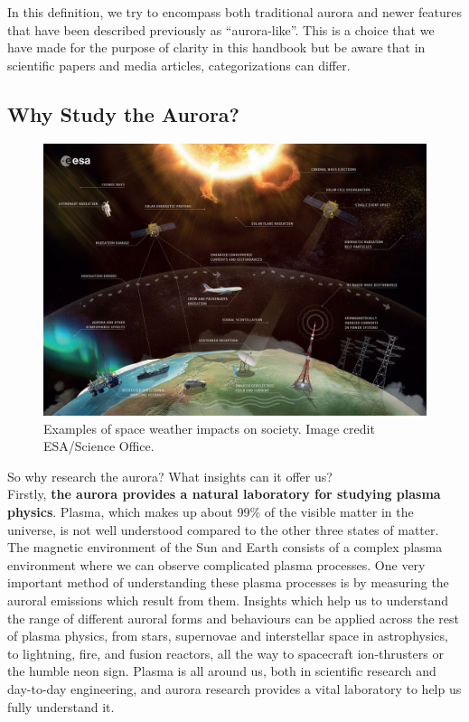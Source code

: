 \documentclass{article}
\newcommand{\contributed}[1]{%
    \par\noindent
    \begingroup
    \setlength{\leftskip}{1em}%
    \itshape
    Contributors: #1
    \par
    \endgroup
    \vspace{0.5em}
}
\begin{document}
In this definition, we try to encompass both traditional aurora and newer features that have been described previously as ``aurora-like''. This is a choice that we have made for the purpose of clarity in this handbook but be aware that in scientific papers and media articles, categorizations can differ.




\subsection{Why Study the Aurora?}

\begin{figure}[h!]
  \includegraphics[width=\linewidth]{Fig2_SpaceWeather.jpg}
  \caption{Examples of space weather impacts on society. Image credit ESA/Science Office.}
  \label{space weather}
  
\end{figure}

So why research the aurora? What insights can it offer us?\\
Firstly, \textbf{the aurora provides a natural laboratory for studying plasma physics}. Plasma, which makes up about 99\% of the visible matter in the universe, is not well understood compared to the other three states of matter. The magnetic environment of the Sun and Earth consists of a complex plasma environment where we can observe complicated plasma processes. One very important method of understanding these plasma processes is by measuring the auroral emissions which result from them. Insights which help us to understand the range of different auroral forms and behaviours can be applied across the rest of plasma physics, from stars, supernovae and interstellar space in astrophysics, to lightning, fire, and fusion reactors, all the way to spacecraft ion-thrusters or the humble neon sign. Plasma is all around us, both in scientific research and day-to-day engineering, and aurora research provides a vital laboratory to help us fully understand it.
\end{document}
